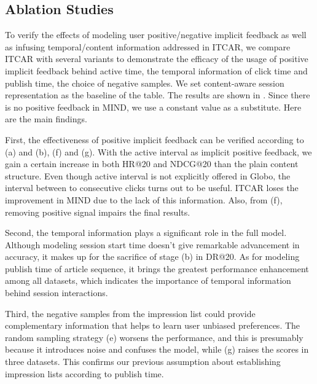 \subsection{Ablation Studies}
\label{sec:abla}
To verify the effects of modeling user positive/negative implicit feedback as well as infusing temporal/content information addressed in ITCAR, we compare ITCAR with several variants to demonstrate the efficacy of the usage of positive implicit feedback behind active time, the temporal information of click time and publish time, the choice of negative samples. We set content-aware session representation as the baseline of the table. The results are shown in . Since there is no positive feedback in MIND, we use a 
constant value as a substitute. Here are the main findings. 

First, the effectiveness of positive implicit feedback can be verified according to (a) and (b), (f) and (g). With the active interval as implicit positive feedback, we gain a certain increase in both HR@20 and NDCG@20 than the plain content structure. Even though active interval is not explicitly offered in Globo, the interval between to consecutive clicks turns out to be useful. ITCAR loses the improvement in MIND due to the lack of this information. Also, from (f), removing positive signal impairs the final results.

Second, the temporal information plays a significant role in the full model. Although modeling session start time doesn't give remarkable advancement in accuracy, it makes up for the sacrifice of stage (b) in DR@20. As for modeling publish time of article sequence, it brings the greatest performance enhancement among all datasets, which indicates the importance of temporal information behind session interactions. 

Third, the negative samples from the impression list could provide complementary information that helps to learn user unbiased preferences. The random sampling strategy (e) worsens the performance, and this is presumably because it introduces noise and confuses the model, while (g) raises the scores in three datasets. This confirms our previous assumption about establishing impression lists according to publish time.

